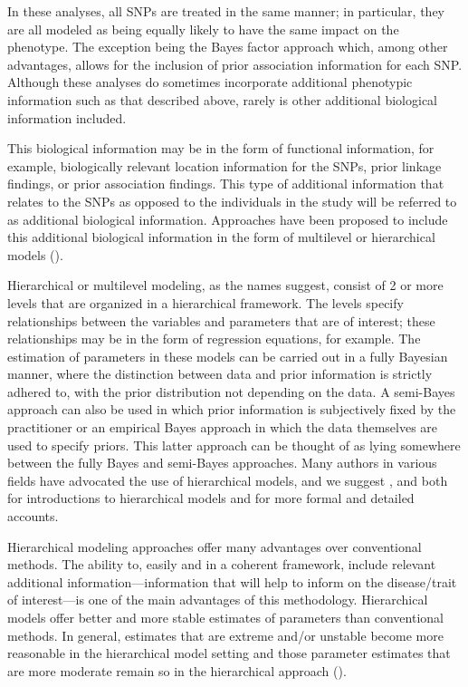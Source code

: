 In these analyses, all SNPs are treated in the same manner; in
particular, they are all modeled as being equally likely to have
the same impact on the phenotype. The exception being the Bayes
factor approach which, among other advantages, allows for the
inclusion of prior association information for each SNP. Although
these analyses do sometimes incorporate additional phenotypic
information such as that described above, rarely is other
additional biological information included.

This biological information may be in the form of functional
information, for example, biologically relevant location
information for the SNPs, prior linkage findings, or prior
association findings. This type of additional information
that relates to the SNPs as opposed to the individuals in the
study will be referred to as additional biological information.
Approaches have been proposed to include this additional
biological information in the form of multilevel or hierarchical
models
(\citealp{Duditetal02,rma2003,LW2004,rieger2004}).

Hierarchical or multilevel modeling, as the names suggest,
consist of 2 or more levels that are organized in a
hierarchical framework. The levels specify relationships between
the variables and parameters that are of interest; these
relationships may be in the form of regression equations, for
example. The estimation of parameters in these models can be
carried out in a fully Bayesian manner, where the distinction
between data and prior information is strictly adhered to, with
the prior distribution not depending on the data. A semi-Bayes
approach can also be used in which prior information is
subjectively fixed by the practitioner or an empirical Bayes
approach in which the data themselves are used to specify priors.
This latter approach can be thought of as lying somewhere between
the fully Bayes and semi-Bayes approaches. Many authors in
various fields have advocated the use of hierarchical models,
and we suggest
\citet{tomlins2005},
\citet{TTC01}
and
\citet{Barlow_Bartholomew:1972}
both for introductions to hierarchical models and for more
formal and detailed accounts.

Hierarchical modeling approaches offer many advantages over
conventional methods. The ability to, easily and in a coherent
framework, include relevant additional information---information
that will help to inform on the disease/trait of interest---is one
of the main advantages of this methodology. Hierarchical models
offer better and more stable estimates of parameters than
conventional methods. In general, estimates that are extreme
and/or unstable become more reasonable in the hierarchical model
setting and those parameter estimates that are more moderate
remain so in the hierarchical approach
(\citealp{Gichangi_Vach:2006}).

